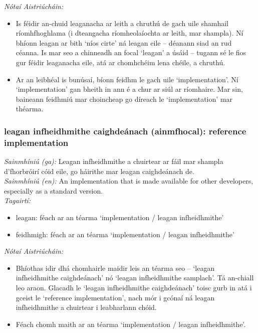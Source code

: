  \noindent \textit{Nótaí Aistriúcháin:}
\begin{itemize}
	\item Is féidir an-chuid leaganacha ar leith a chruthú de gach uile shamhail ríomhfhoghlama (i dteangacha ríomheolaíochta ar leith, mar shampla). Ní bhíonn leagan ar bith `níos cirte' ná leagan eile -- déanann siad an rud céanna. Is mar seo a chinneadh an focal `leagan' a úsáid -- tugann sé le fios gur féidir leaganacha eile, atá ar chomhchéim lena chéile, a chruthú.
	\item Ar an leibhéal is bunúsaí, bíonn feidhm le gach uile `implementation'. Ní `implementation' gan bheith in ann é a chur ar siúl ar ríomhaire. Mar sin, baineann feidhmiú mar choincheap go díreach le `implementation' mar théarma.
\end{itemize}


\subsubsection*{leagan infheidhmithe caighdeánach (ainmfhocal): reference implementation}
 \noindent \textit{Sainmhíniú (ga):} Leagan infheidhmithe a chuirtear ar fáil mar shampla d'fhorbróirí cóid eile, go háirithe mar leagan caighdeánach de.
\\
 \noindent \textit{Sainmhíniú (en):} An implementation that is made available for other developers, especially as a standard version.
\\
 \noindent \textit{Tagairtí:}
\begin{itemize}
	\item leagan: féach ar an téarma `implementation / leagan infheidhmithe'
	\item feidhmigh: féach ar an téarma `implementation / leagan infheidhmithe'
\end{itemize}

 \noindent \textit{Nótaí Aistriúcháin:}
\begin{itemize}
	\item Bhíothas idir dhá chomhairle maidir leis an téarma seo -- `leagan infheidhmithe caighdeánach' nó `leagan infheidhmithe samplach'. Tá an-chiall leo araon. Glacadh le `leagan infheidhmithe caighdeánach' toisc gurb in atá i gceist le `reference implementation', nach mór i gcónaí ná leagan infheidhmithe a chuirtear i leabharlann chóid.
	\item Féach chomh maith ar an téarma `implementation / leagan infheidhmithe'.
\end{itemize}



